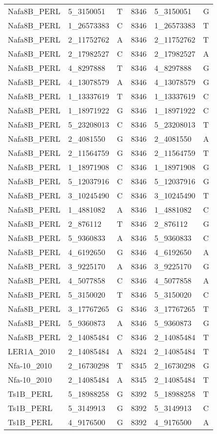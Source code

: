 \begin{center}
\begin{longtable}{|l|l|l|l|l|l|}
Nafa8B\_PERL&5\_3150051&T&8346&5\_3150051&G\\
Nafa8B\_PERL&1\_26573383&C&8346&1\_26573383&T\\
Nafa8B\_PERL&2\_11752762&A&8346&2\_11752762&T\\
Nafa8B\_PERL&2\_17982527&C&8346&2\_17982527&A\\
Nafa8B\_PERL&4\_8297888&T&8346&4\_8297888&G\\
Nafa8B\_PERL&4\_13078579&A&8346&4\_13078579&G\\
Nafa8B\_PERL&1\_13337619&T&8346&1\_13337619&C\\
Nafa8B\_PERL&1\_18971922&G&8346&1\_18971922&C\\
Nafa8B\_PERL&5\_23208013&C&8346&5\_23208013&T\\
Nafa8B\_PERL&2\_4081550&G&8346&2\_4081550&A\\
Nafa8B\_PERL&2\_11564759&G&8346&2\_11564759&T\\
Nafa8B\_PERL&1\_18971908&C&8346&1\_18971908&G\\
Nafa8B\_PERL&5\_12037916&C&8346&5\_12037916&G\\
Nafa8B\_PERL&3\_10245490&C&8346&3\_10245490&T\\
Nafa8B\_PERL&1\_4881082&A&8346&1\_4881082&C\\
Nafa8B\_PERL&2\_876112&T&8346&2\_876112&G\\
Nafa8B\_PERL&5\_9360833&A&8346&5\_9360833&C\\
Nafa8B\_PERL&4\_6192650&G&8346&4\_6192650&A\\
Nafa8B\_PERL&3\_9225170&A&8346&3\_9225170&G\\
Nafa8B\_PERL&4\_5077858&C&8346&4\_5077858&A\\
Nafa8B\_PERL&5\_3150020&T&8346&5\_3150020&C\\
Nafa8B\_PERL&3\_17767265&G&8346&3\_17767265&T\\
Nafa8B\_PERL&5\_9360873&A&8346&5\_9360873&G\\
Nafa8B\_PERL&2\_14085484&C&8346&2\_14085484&T\\
LER1A\_2010&2\_14085484&A&8324&2\_14085484&T\\
Nfa-10\_2010&2\_16730298&T&8345&2\_16730298&G\\
Nfa-10\_2010&2\_14085484&A&8345&2\_14085484&T\\
Ts1B\_PERL&5\_18988258&G&8392&5\_18988258&T\\
Ts1B\_PERL&5\_3149913&G&8392&5\_3149913&C\\
Ts1B\_PERL&4\_9176500&G&8392&4\_9176500&A\\

\end{longtable}
\end{center}
